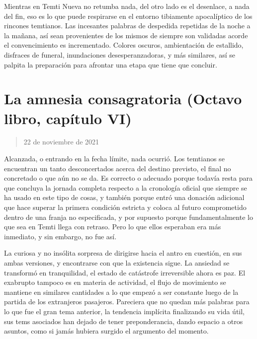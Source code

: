 \documentclass[
]{book}
\begin{document}
Mientras en Temti Nueva no retumba nada, del otro lado es el desenlace, a nada del fin, eso es lo que puede respirarse en el entorno tibiamente apocalíptico de los rincones temtianos. Las incesantes palabras de despedida repetidas de la noche a la mañana, así sean provenientes de los mismos de siempre son validadas acorde el convencimiento es incrementado. Colores oscuros, ambientación de estallido, disfraces de funeral, inundaciones desesperanzadoras, y más similares, así se palpita la preparación para afrontar una etapa que tiene que concluir.

\hypertarget{la-amnesia-consagratoria-octavo-libro-capuxedtulo-vi}{%
\section{La amnesia consagratoria (Octavo libro, capítulo VI)}\label{la-amnesia-consagratoria-octavo-libro-capuxedtulo-vi}}

\begin{quote}
22 de noviembre de 2021
\end{quote}

Alcanzada, o entrando en la fecha límite, nada ocurrió. Los temtianos se encuentran un tanto desconcertados acerca del destino previsto, el final no concretado o que aún no se da. Es correcto o adecuado porque todavía resta para que concluya la jornada completa respecto a la cronología oficial que siempre se ha usado en este tipo de cosas, y también porque entró una donación adicional que hace superar la primera condición estricta y coloca al futuro comprometido dentro de una franja no especificada, y por supuesto porque fundamentalmente lo que sea en Temti llega con retraso. Pero lo que ellos esperaban era más inmediato, y sin embargo, no fue así.

La curiosa y no insólita sorpresa de dirigirse hacia el antro en cuestión, en sus ambas versiones, y encontrarse con que la existencia sigue. La ansiedad se transformó en tranquilidad, el estado de catástrofe irreversible ahora es paz. El exabrupto tampoco es en materia de actividad, el flujo de movimiento se mantiene en similares cantidades a lo que empezó a ser constante luego de la partida de los extranjeros pasajeros. Pareciera que no quedan más palabras para lo que fue el gran tema anterior, la tendencia implícita finalizando su vida útil, sus tems asociados han dejado de tener preponderancia, dando espacio a otros asuntos, como si jamás hubiera surgido el argumento del momento.
\end{document}
